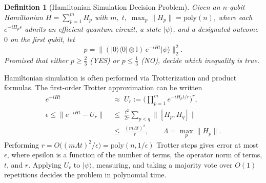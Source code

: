 \documentclass[%
 aip,
 amsmath,amssymb,
 reprint,%
]{revtex4-1}
\newtheorem{identity}{{Definition}}
\newcommand{\Id}{\mathbb{I}}       %
\begin{document}
{\begin{identity}[Hamiltonian Simulation Decision Problem]
    Given an $n$-qubit Hamiltonian $H=\sum_{p=1}^{m}H_p$ with
    $m,\;t,\;\max_p\|H_p\|=\mathrm{poly}(n)$, where each $e^{-iH_p s}$
    admits an efficient quantum circuit, a state $|\psi\rangle$, and
    a designated outcome $0$ on the first qubit, let
    \[
        p=\big\|(|0\rangle\langle 0|\otimes \Id)\,e^{-iHt}|\psi\rangle\big\|^{2}_2.
    \]
    Promised that either $p\geq\tfrac{2}{3}$ (YES) or $p\leq\tfrac{1}{3}$ (NO),
    decide which inequality is true.
\end{identity}
 Hamiltonian simulation is often performed via Trotterization and product formulas. The first-order Trotter approximation can be written
\begin{align*}
    e^{-iHt}\;&\approx\; U_r:=\Big(\prod_{p=1}^{m}e^{-iH_p t/r}\Big)^{r},
    \\[4pt]
    \epsilon \leq \big\|e^{-iHt}-U_r\big\|
    \;&\leq\; \frac{t^{2}}{2r}\sum_{p<q}\big\|[H_p,H_q]\big\|
    \\[4pt]
    \;&\leq\; \frac{(m\Lambda t)^{2}}{r},
    \qquad \Lambda=\max_p\|H_p\|.
\end{align*}
Performing $r=O\!\big((m\Lambda t)^{2}/\epsilon\big)=\mathrm{poly}(n,1/\epsilon)$
Trotter steps gives error at most $\epsilon$, where epsilon is a function of the number of terms, the operator norm of terms, $t$, and $r$. Applying $U_r$ to $|\psi\rangle$, measuring, and
taking a majority vote over $O(1)$ repetitions decides the problem in polynomial time. %
}
\end{document}

